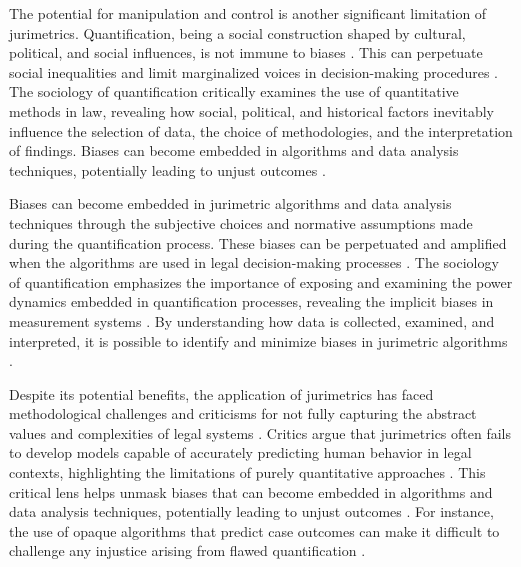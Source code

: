 The potential for manipulation and control is another significant limitation of jurimetrics. Quantification, being a social construction shaped by cultural, political, and social influences, is not immune to biases \cite{10.1590/dados.2022.65.3.267,10.3390/fi9040068}. This can perpetuate social inequalities and limit marginalized voices in decision-making procedures \cite{10.1590/dados.2022.65.3.267,10.3390/fi9040068}. The sociology of quantification critically examines the use of quantitative methods in law, revealing how social, political, and historical factors inevitably influence the selection of data, the choice of methodologies, and the interpretation of findings. Biases can become embedded in algorithms and data analysis techniques, potentially leading to unjust outcomes \cite{10.1590/dados.2022.65.3.267,10.1057/s41599-020-00557-0}.

Biases can become embedded in jurimetric algorithms and data analysis techniques through the subjective choices and normative assumptions made during the quantification process. These biases can be perpetuated and amplified when the algorithms are used in legal decision-making processes \cite{10.1590/dados.2022.65.3.267,10.1007/978-3-319-44000-215}. The sociology of quantification emphasizes the importance of exposing and examining the power dynamics embedded in quantification processes, revealing the implicit biases in measurement systems \cite{10.1057/s41599-020-00557-0,10.1080/07329113.2015.1046739}. By understanding how data is collected, examined, and interpreted, it is possible to identify and minimize biases in jurimetric algorithms \cite{10.1590/dados.2022.65.3.267,10.1007/978-3-319-44000-215}.

Despite its potential benefits, the application of jurimetrics has faced methodological challenges and criticisms for not fully capturing the abstract values and complexities of legal systems \cite{nunes2016jurimetria}. Critics argue that jurimetrics often fails to develop models capable of accurately predicting human behavior in legal contexts, highlighting the limitations of purely quantitative approaches \cite{nunes2016jurimetria}. This critical lens helps unmask biases that can become embedded in algorithms and data analysis techniques, potentially leading to unjust outcomes \cite{10.1590/dados.2022.65.3.267,10.3390/fi9040068}. For instance, the use of opaque algorithms that predict case outcomes can make it difficult to challenge any injustice arising from flawed quantification \cite{10.1590/dados.2022.65.3.267,10.1057/s41599-020-0396-5}.

